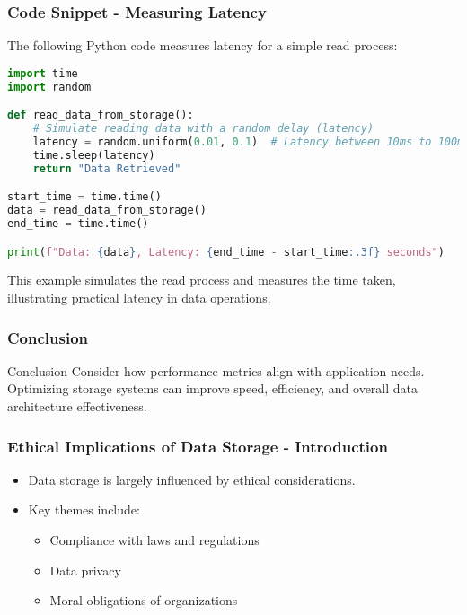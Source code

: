 \documentclass[aspectratio=169]{beamer}
\begin{document}
\begin{frame}[fragile]
    \frametitle{Code Snippet - Measuring Latency}
    The following Python code measures latency for a simple read process:
    \begin{lstlisting}[language=Python]
import time
import random

def read_data_from_storage():
    # Simulate reading data with a random delay (latency)
    latency = random.uniform(0.01, 0.1)  # Latency between 10ms to 100ms
    time.sleep(latency)
    return "Data Retrieved"

start_time = time.time()
data = read_data_from_storage()
end_time = time.time()

print(f"Data: {data}, Latency: {end_time - start_time:.3f} seconds")
    \end{lstlisting}

    This example simulates the read process and measures the time taken, illustrating practical latency in data operations.
\end{frame}

\begin{frame}
    \frametitle{Conclusion}
    \begin{block}{Conclusion}
        Consider how performance metrics align with application needs. Optimizing storage systems can improve speed, efficiency, and overall data architecture effectiveness.
    \end{block}
\end{frame}

\begin{frame}[fragile]
    \frametitle{Ethical Implications of Data Storage - Introduction}
    \begin{itemize}
        \item Data storage is largely influenced by ethical considerations.
        \item Key themes include:
        \begin{itemize}
            \item Compliance with laws and regulations
            \item Data privacy
            \item Moral obligations of organizations
        \end{itemize}
    \end{itemize}
\end{frame}
\end{document}
